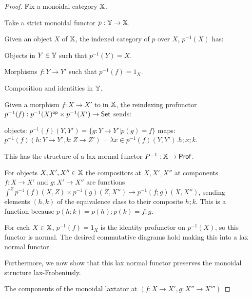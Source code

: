 \begin{proof}
Fix a monoidal category $\mathbb{X}$.

Take a strict monoidal functor $p:\mathbb{Y}\to\mathbb{X}$.


Given an object $X$ of $\mathbb{X}$, the indexed category of $p$ over $X$, $p^{-1}(X)$ has:

Objects in $Y \in \mathbb{Y}$ such that $p^{-1}(Y)=X$.

Morphisms $f:Y\to Y'$ such that $p^{-1}(f)=1_X$.

Composition and identities in $\mathbb{Y}$.


Given a morphism $f:X\to X'$ to in $\mathbb{X}$, the reindexing profunctor $p^{-1}(f):p^{-1}(X)^{\mathsf{op}}  \times p^{-1}(X')\to \mathsf{Set}$ sends:

objects: $p^{-1}(f)(Y,Y')= \{ g:Y\to Y' | p(g)=f \}$
maps: $p^{-1}(f)(h:Y\to Y', k:Z \to Z')=\lambda x \in p^{-1}(f)(Y,Y'). h;x;k$.


This has the structure of a lax normal functor $P^{-1}:\mathbb{X}\to{\sf Prof}$.


For objects $X,X',X'' \in \mathbb{X}$ the compositors at $X,X',X''$ at components $f:X\to X'$ and $g:X'\to X''$ are functions $\int^Z p^{-1}(f)(X,Z) \times p^{-1}(g)(Z,X'') \to  p^{-1}(f;g)(X,X'')$,
sending elements $(h,k)$ of the equivalence class to their composite $h;k$.  This is a function because $p(h;k) = p(h);p(k)=f;g$.


For each $X \in \mathbb{X}$, $p^{-1}(f)=1_X$ is the identity profunctor on $p^{-1}(X)$, so this functor is normal.
The desired commutative diagrams hold making this into a lax normal functor.

Furthermore, we now show that this lax normal functor preserves the monoidal structure lax-Frobeniusly.

 


%
%
%
%
%
%
%
%
%




The components of the monoidal laxtator at $(f:X\to X',g:X''\to X''')$


\end{proof}
